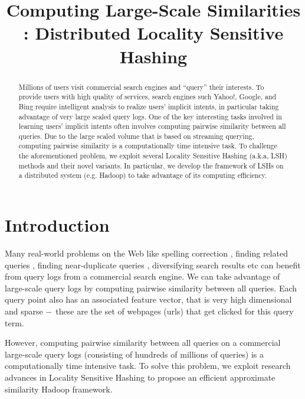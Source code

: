 \documentclass[11pt]{article}
\title{Computing Large-Scale Similarities : Distributed Locality Sensitive Hashing}
\begin{document}
\maketitle 

\begin{abstract}
Millions of users visit commercial search engines and  ``query'' their interests.
To provide users with high quality of services, 
search engines such Yahoo!, Google, and Bing require
intelligent analysis to realize users' implicit intents, in particular taking
advantage of very large scaled query logs.  One of the key
interesting tasks involved in learning users' implicit intents often involves 
computing pairwise similarity between all queries.
Due to the large scaled volume that is based on streaming querying, 
computing pairwise similarity is a computationally time intensive task. 
To challenge the aforementioned problem, we exploit  several
Locality Sensitive Hashing (a.k.a, LSH) methods and their novel variants. 
In particular, we develop the framework of LSHs on a distributed system (e.g. Hadoop) to take
advantage of its computing efficiency.




\end{abstract}


 \section{Introduction}
Many real-world problems on the Web like spelling correction \cite{}, 
finding related queries \cite{Jones06WWW,Jain11SIGIR,Song12WSDM}, finding near-duplicate queries \cite{}, 
diversifying search results \cite{Song11SIGIR} etc 
can benefit from query logs from a commercial search engine. 
We can take advantage of large-scale query logs 
by computing pairwise similarity between all queries. Each query point also has an associated feature vector, that is
very high dimensional and sparse $\--$ these are the set of webpages (urls) that
get clicked for this query term.

However, computing pairwise similarity between 
all queries on a commercial large-scale query logs (consisting of hundreds of millions of  queries) 
is a computationally time intensive task. 
To solve this problem, we exploit research advances in Locality Sensitive Hashing 
\cite{Indyk98STOC,Charikar02STOC,Andoni06FOCS,Andoni08CACM}  
to propose an efficient approximate similarity Hadoop framework.  
\end{document}
